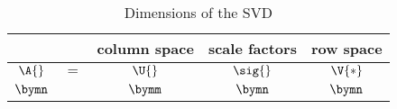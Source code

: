 \begin{table}[htdp]
\caption{Dimensions of the SVD}
\begin{center}
\begin{tabular}{ccccc}
%
  && column space & scale factors & row space \\\hline
%
  $\A{}$ & $=$ & $\U{}$ & $\sig{}$ & $\V{*}$ \\
%
  $\bymn$ && $\bymm$ & $\bymn$ & $\bymn$
%
\end{tabular}
\end{center}
\label{tab:svden:svd dimensions}
\end{table}\\

\endinput